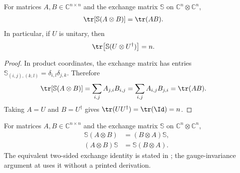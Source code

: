 \begin{lemma}
    \label{lem:matrix_trace_swap_kronecker}
    \leanok
    For matrices $A,B\in\mathbb C^{n\times n}$ and the exchange matrix $\mathbb S$ on
    $\mathbb C^n\otimes\mathbb C^n$,
    \begin{align}
        \tr\!\left[\mathbb S(A\otimes B)\right] & =\tr(AB).
    \end{align}
    In particular, if $U$ is unitary, then
    \begin{align}
        \tr\!\left[\mathbb S(U\otimes U^\dagger)\right] & =n.
    \end{align}
\end{lemma}

\begin{proof}\leanok
    In product coordinates, the exchange matrix has entries
    $\mathbb S_{(i,j),(k,l)}=\delta_{i,l}\delta_{j,k}$. Therefore
    \begin{align}
        \tr\!\left[\mathbb S(A\otimes B)\right]
         & =\sum_{i,j}A_{j,i}B_{i,j}
        =\sum_{i,j}A_{i,j}B_{j,i}
        =\tr(AB).
    \end{align}
    Taking $A=U$ and $B=U^\dagger$ gives
    $\tr(UU^\dagger)=\tr(\Id)=n$.
\end{proof}

\begin{lemma}
    \label{thm:matrix_swap_kronecker_intertwine}
    \leanok
    For matrices $A,B\in\mathbb C^{n\times n}$ and the exchange matrix
    $\mathbb S$ on $\mathbb C^n\otimes\mathbb C^n$,
    \begin{align}
        \mathbb S(A\otimes B) & =(B\otimes A)\mathbb S,
        \label{eq:matrix_swap_kron_left}                \\
        (A\otimes B)\mathbb S & =\mathbb S(B\otimes A).
        \label{eq:matrix_swap_kron_right}
    \end{align}
    The equivalent two-sided exchange identity is stated in
    \cite[lines~1316--1319]{Cirac2017MPU}; the gauge-invariance argument at
    \cite[lines~1624--1630]{Cirac2017MPU} uses it without a printed derivation.
\end{lemma}

